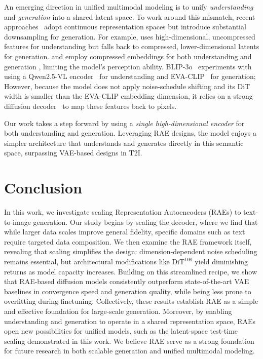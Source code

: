\documentclass[10pt,twocolumn,letterpaper]{article}
\newcommand{\DDT}{$\text{DiT}^{\text{DH}}$\xspace} %
\begin{document}
An emerging direction in unified multimodal modeling is to unify \emph{understanding} and \emph{generation} into a shared latent space. 
To work around this mismatch, recent approaches~\citep{unilip,vugen,uniflow,atoken,huang2025ming} adopt continuous representation spaces but introduce substantial downsampling for generation. 
For example, \citet{vugen} uses high-dimensional, uncompressed features for understanding but falls back to compressed, lower-dimensional latents for generation. 
\citet{jiao2025unitoken} and \citet{uniflow} employ compressed embeddings for both understanding and generation
, limiting the model's perception ability. 
BLIP-3o~\citep{blip3o} experiments with using a Qwen2.5-VL encoder~\citep{bai2025qwen2} for understanding and EVA-CLIP~\citep{sun2023eva, sun2024eva} for generation; However, because the model does not apply noise-schedule shifting and its DiT width is smaller than the EVA-CLIP embedding dimension, it relies on a strong diffusion decoder~\citep{podell2023sdxl} to map these features back to pixels.




Our work takes a step forward by using a \emph{single high-dimensional encoder} for both understanding and generation. 
Leveraging RAE designs, the model enjoys a simpler architecture that understands and generates directly in this semantic space, surpassing VAE-based designs in T2I.

\section{Conclusion}
In this work, we investigate scaling Representation Autoencoders (RAEs) to text-to-image generation. Our study begins by scaling the decoder, where we find that while larger data scales improve general fidelity, specific domains such as text require targeted data composition. We then examine the RAE framework itself, revealing that scaling simplifies the design: dimension-dependent noise scheduling remains essential, but architectural modifications like \DDT{} yield diminishing returns as model capacity increases. Building on this streamlined recipe, we show that RAE-based diffusion models consistently outperform state-of-the-art VAE baselines in convergence speed and generation quality, while being less prone to overfitting during finetuning. Collectively, these results establish RAE as a simple and effective foundation for large-scale generation. Moreover, by enabling understanding and generation to operate in a shared representation space, RAEs open new possibilities for unified models, such as the latent-space test-time scaling demonstrated in this work. We believe RAE serve as a strong foundation for future research in both scalable generation and unified multimodal modeling.
\end{document}
